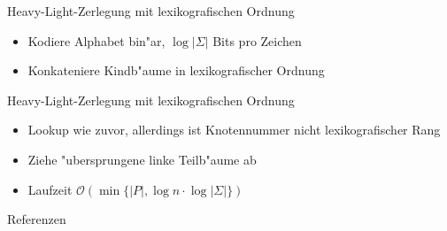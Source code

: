\documentclass[ngerman,hyperref={pdfpagelabels=true}]{beamer}
\begin{document}
\begin{frame}{Heavy-Light-Zerlegung mit lexikografischen Ordnung}
\begin{itemize}
\item Kodiere Alphabet bin"ar, $\log |\Sigma|$ Bits pro Zeichen
\item Konkateniere Kindb"aume in lexikografischer Ordnung
\end{itemize}


\end{frame}

\begin{frame}{Heavy-Light-Zerlegung mit lexikografischen Ordnung}
\begin{itemize}
\item Lookup wie zuvor, allerdings ist Knotennummer nicht lexikografischer Rang
\item Ziehe "ubersprungene linke Teilb"aume ab
\item Laufzeit $\mathcal{O}(\min\{|P|, \log n \cdot \log |\Sigma|\})$
\end{itemize}

\end{frame}

\begin{frame}{Referenzen}


\end{frame}
\end{document}
